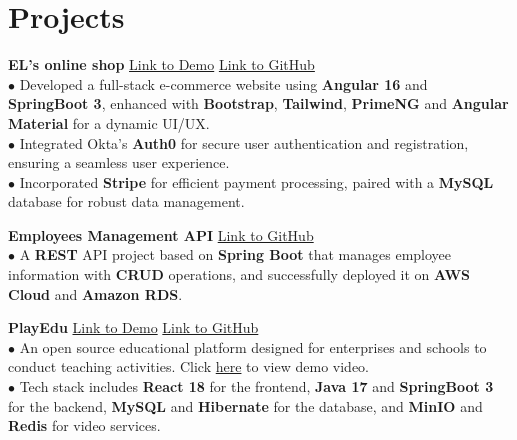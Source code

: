 \documentclass[letterpaper,12pt]{article}
\begin{document}
\section{Projects}

\textbf{EL's online shop} \hfill \href{https://youtu.be/q0_N9ydf67c}{Link to Demo} \hspace{0.2cm} \href{https://github.com/Zicheng-Li/Angular-ecommerce-frontend}{Link to GitHub}\\
\hspace{0.1cm} $\bullet$ Developed a full-stack e-commerce website using \textbf{Angular 16} and \textbf{SpringBoot 3}, enhanced with \textbf{Bootstrap}, \textbf{Tailwind}, \textbf{PrimeNG} and \textbf{Angular Material} for a dynamic UI/UX. \\
\hspace{0.1cm} $\bullet$ Integrated Okta's \textbf{Auth0} for secure user authentication and registration, ensuring a seamless user experience. \\ 
\hspace{0.1cm} $\bullet$ Incorporated \textbf{Stripe} for efficient payment processing, paired with a \textbf{MySQL} database for robust data management.

\textbf{Employees Management API} \hfill \href{https://github.com/Zicheng-Li/employees-management-project}{Link to GitHub} \\
\hspace{0.1cm} $\bullet$ A \textbf{REST} API project based on \textbf{Spring Boot} that manages employee information with \textbf{CRUD} operations, and successfully deployed it on \textbf{AWS Cloud} and \textbf{Amazon RDS}.

\textbf{PlayEdu} \hfill \href{https://youtu.be/8IWqM2eHLhc}{Link to Demo} \hspace{0.2cm} \href{https://github.com/Zicheng-Li/React-Spring_Boot-PlayEdu}{Link to GitHub} \\
\hspace{0.1cm} $\bullet$ An open source educational platform designed for enterprises and schools to conduct teaching activities. Click \href{https://youtu.be/8IWqM2eHLhc}{here} to view demo video.\\
\hspace{0.1cm} $\bullet$ Tech stack includes \textbf{React 18} for the frontend, \textbf{Java 17} and \textbf{SpringBoot 3} for the backend, \textbf{MySQL} and \textbf{Hibernate} for the database, and \textbf{MinIO} and \textbf{Redis} for video services.
\end{document}

